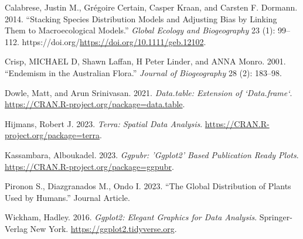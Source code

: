 \documentclass[
]{article}
\newlength{\cslhangindent}
\newlength{\cslentryspacingunit} %
\newenvironment{CSLReferences}[2] %
 {%
  \setlength{\parindent}{0pt}
  \ifodd #1
  \let\oldpar\par
  \def\par{\hangindent=\cslhangindent\oldpar}
  \fi
  \setlength{\parskip}{#2\cslentryspacingunit}
 }%
 {}
\begin{document}
\hypertarget{refs}{}
\begin{CSLReferences}{1}{0}
\leavevmode{}%
Calabrese, Justin M., Grégoire Certain, Casper Kraan, and Carsten F.
Dormann. 2014. {``Stacking Species Distribution Models and Adjusting
Bias by Linking Them to Macroecological Models.''} \emph{Global Ecology
and Biogeography} 23 (1): 99--112.
https://doi.org/\url{https://doi.org/10.1111/geb.12102}.

\leavevmode{}%
Crisp, MICHAEL D, Shawn Laffan, H Peter Linder, and ANNA Monro. 2001.
{``Endemism in the Australian Flora.''} \emph{Journal of Biogeography}
28 (2): 183--98.

\leavevmode{}%
Dowle, Matt, and Arun Srinivasan. 2021. \emph{Data.table: Extension of
`Data.frame`}. \url{https://CRAN.R-project.org/package=data.table}.

\leavevmode{}%
Hijmans, Robert J. 2023. \emph{Terra: Spatial Data Analysis}.
\url{https://CRAN.R-project.org/package=terra}.

\leavevmode{}%
Kassambara, Alboukadel. 2023. \emph{Ggpubr: 'Ggplot2' Based Publication
Ready Plots}. \url{https://CRAN.R-project.org/package=ggpubr}.

\leavevmode{}%
Pironon S., Diazgranados M., Ondo I. 2023. {``The Global Distribution of
Plants Used by Humans.''} Journal Article.

\leavevmode{}%
Wickham, Hadley. 2016. \emph{Ggplot2: Elegant Graphics for Data
Analysis}. Springer-Verlag New York.
\url{https://ggplot2.tidyverse.org}.

\end{CSLReferences}
\end{document}
